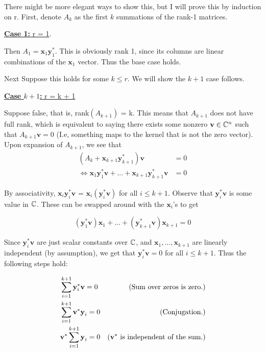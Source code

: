 \begin{solution}

    There might be more elegant ways to show this, but I will prove this by induction on r. First, denote $A_k$ as the first $k$ summations of the rank-1 matrices.

    \jump
    \underline{\textbf{Case 1:} r = 1}.
    \jump

    Then $A_1 = \textbf{x}_1\textbf{y}_1^*$. This is obviously rank 1, since its columns are linear combinations of the $\textbf{x}_1$ vector. Thus the base case holds. 

    Next Suppose this holds for some $k \leq r$. We will show the $k+1$ case follows. 

    \jump
    \underline{\textbf{Case $k + 1$:} r = k + 1}
    \jump
    
    Suppose false, that is, rank$(A_{k+1})$ = k. This means that $A_{k+1}$ does not have full rank, which is equivalent to saying there exists some nonzero $\textbf{v} \in \mathbb{C}^n$ such that $A_{k+1}\textbf{v} = 0$ (I.e, something maps to the kernel that is not the zero vector). Upon expansion of $A_{k+1}$, we see that
    \begin{align}
        (A_k + \textbf{x}_{k+1}\textbf{y}^*_{k+1})\textbf{v} &= 0 \nonumber\\
        \iff \textbf{x}_{1}\textbf{y}^*_{1}\textbf{v} + ... + \textbf{x}_{k+1}\textbf{y}^*_{k+1}\textbf{v} &= 0 \nonumber
    \end{align}

    By associativity, $\textbf{x}_{i}\textbf{y}^*_{i}\textbf{v}$ = $\textbf{x}_{i}(\textbf{y}^*_{i}\textbf{v})$ for all $i \leq k+1$. Observe that $\textbf{y}^*_{i}\textbf{v}$ is some value in $\mathbb{C}$. These can be swapped around with the  $\textbf{x}_i$'s to get

    \[
    (\textbf{y}^*_{1}\textbf{v})\textbf{x}_{1} + ... + (\textbf{y}^*_{k+1}\textbf{v})\textbf{x}_{k+1} = 0 
    \]

    Since $\textbf{y}^*_{i}\textbf{v}$ are just scalar constants over $\mathbb{C}$, and $\textbf{x}_1, ..., \textbf{x}_{k+1}$ are linearly independent (by assumption), we get that $\textbf{y}^*_{i}\textbf{v} = 0$ for all $i \leq k+1$. Thus the following steps hold:

    \newpage
    \alignbreak
    \begin{align}
        &\sum_{i = 1}^{k+1}\textbf{y}_i^* \textbf{v} = 0 &\text{(Sum over zeros is zero.)}\nonumber\\
        &\sum_{i = 1}^{k+1}\textbf{v}^*\textbf{y}_i  = 0 &\text{(Conjugation.)}\nonumber\\
        &\textbf{v}^*\sum_{i = 1}^{k+1}\textbf{y}_i = 0 &\text{(\textbf{v}$^*$ is independent of the sum.)}\nonumber
    \end{align}
    \alignbreak


\end{solution}
